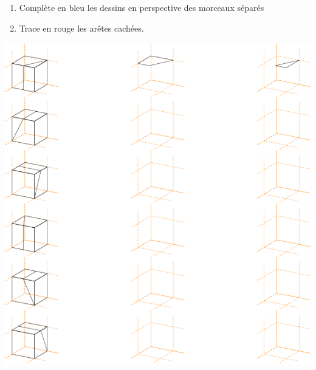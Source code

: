 
\begin{enumerate}
  \item Complète en bleu les dessins en perspective des morceaux séparés
  \item Trace en rouge les arêtes cachées.
\end{enumerate}
\includegraphics[scale=1]{RepS-40.png} 

